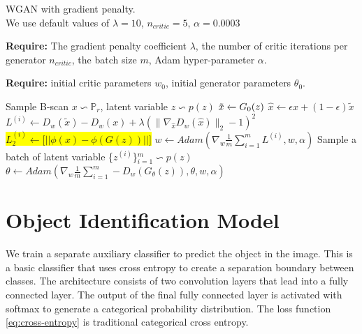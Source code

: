 \begin{algorithm}[H]
  \caption{WGAN with gradient penalty. \\
  We use default values of $\lambda =10$, $n_{critic} = 5$, $\alpha = 0.0003$}\label{euclid}
  
  \textbf{Require:} The gradient penalty coefficient $\lambda$, the number of critic iterations per generator $n_{critic}$, the batch size $m$, Adam hyper-parameter $\alpha$.



\textbf{Require:} initial critic parameters $w_{0}$, initial generator parameters $\theta_{0}$.
  \begin{algorithmic}[1]
   
                \State Sample B-scan $x \backsim \mathbb{P} _{r}$, latent variable $z \backsim p(z)$
                \State $\Tilde{x} \xleftarrow[]{}G_{0}(z)$
                \State $\hat{x} \xleftarrow{}\epsilon x + (1 - \epsilon) \tilde{x}$
                \State $L^{(i)} \xleftarrow{} D_{w}(\tilde{x}) - D_{w}(x) + \lambda(\|{\nabla_{\hat{x}} D_{w}(\hat{x})}\|_{2} - 1)^2$
                \State \colorbox{yellow}{$L_{2}^{(i)} \xleftarrow{} \Big[ \big|\big| \phi(x) - \phi(G(z)) \big|\big| \Big]$}
            \EndFor
            \State $w \xleftarrow{} Adam (\nabla_{w} \frac{1}{m} \sum_{i=1}^{m} L^{(i)}, w, \alpha)$
        \EndFor
        \State Sample a batch of latent variable \{${z^{(i)}}$\}$_{i=1}^{m} \backsim p(z)$
        \State $\theta \xleftarrow{} Adam (\nabla_{w} \frac{1}{m} \sum_{i=1}^{m} -D_{w}(G_{\theta}(z)), \theta, w, \alpha)$
      \EndWhile\label{euclidendwhile}
  \end{algorithmic}
  \label{alg}
\end{algorithm}

\section{Object Identification Model}
\hspace{0.5in}We train a separate auxiliary classifier to predict the object in the image. This is a basic classifier that uses cross entropy to create a separation boundary between classes. The architecture consists of two convolution layers that lead into a fully connected layer. The output of the final fully connected layer is activated with softmax to generate a categorical probability distribution. The loss function \ref{eq:cross-entropy} is traditional categorical cross entropy.

